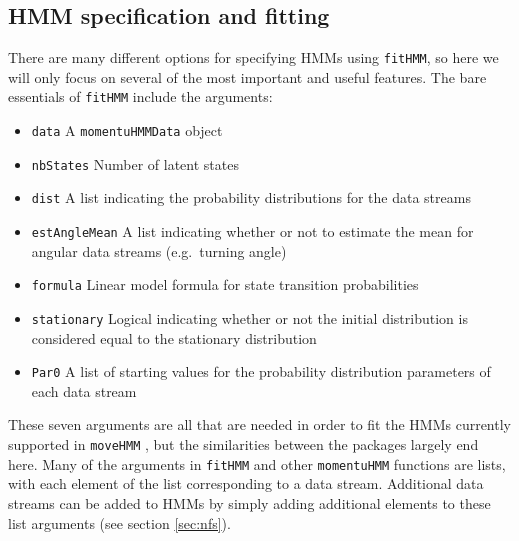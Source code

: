 \documentclass[12pt]{article}\usepackage[]{graphicx}\usepackage[]{color}
\begin{document}
\subsection{HMM specification and fitting}
There are many different options for specifying HMMs using \verb|fitHMM|, so here we will only focus on several of the most important and useful features. The bare essentials of \verb|fitHMM| include the arguments:
\begin{itemize}
  \item{\verb|data|} A \verb|momentuHMMData| object
  \item{\verb|nbStates|} Number of latent states %
  \item{\verb|dist|} A list indicating the probability distributions for the data streams
  \item{\verb|estAngleMean|} A list indicating whether or not to estimate the mean for angular data streams (e.g.\ turning angle)
  \item{\verb|formula|} Linear model formula for state transition probabilities %
  \item{\verb|stationary|} Logical indicating whether or not the initial distribution is considered equal to the stationary distribution
  \item{\verb|Par0|} A list of starting values for the probability distribution parameters of each data stream
\end{itemize}
These seven arguments are all that are needed in order to fit the HMMs currently supported in \verb|moveHMM| \citep{MichelotEtAl2016}, but the similarities between the packages largely end here. Many of the arguments in \verb|fitHMM| and other \verb|momentuHMM| functions are lists, with each element of the list corresponding to a data stream. %
Additional data streams can be added to HMMs by simply adding additional elements to these list arguments (see section \ref{sec:nfs}).  
\end{document}
